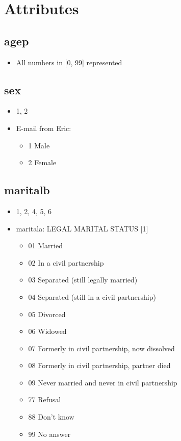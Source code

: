 \documentclass[12pt]{article}
\begin{document}
\section{Attributes}
\subsection{agep}
\begin{itemize}
\item All numbers in [0, 99] represented
\end{itemize}

\subsection{sex}
\begin{itemize}
\item 1, 2
\item E-mail from Eric:
\begin{itemize}
\item 1 Male
\item 2 Female
\end{itemize}
\end{itemize}

\subsection{maritalb}
\begin{itemize}
\item 1, 2, 4, 5, 6
\item maritala: LEGAL MARITAL STATUS [1]
\begin{itemize}
\item 01 Married 
\item 02 In a civil partnership 
\item 03 Separated (still legally married) 
\item 04 Separated (still in a civil partnership) 
\item 05 Divorced 
\item 06 Widowed 
\item 07 Formerly in civil partnership, now dissolved 
\item 08 Formerly in civil partnership, partner died 
\item 09 Never married and never in civil partnership 
\item 77 Refusal 
\item 88 Don't know 
\item 99 No answer 
\end{itemize}
\end{itemize}
\end{document}
